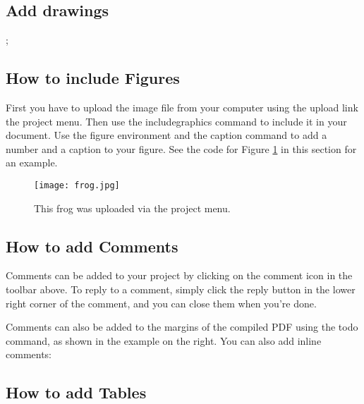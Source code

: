 \documentclass[a4paper,12pt]{article}
\begin{document}
\subsection{Add drawings}

;

\subsection{How to include Figures}

First you have to upload the image file from your computer using the upload link the project menu. Then use the includegraphics command to include it in your document. Use the figure environment and the caption command to add a number and a caption to your figure. See the code for Figure \ref{fig:frog} in this section for an example.

\begin{figure}
\centering
\texttt{[image: frog.jpg]}
\caption{\label{fig:frog}This frog was uploaded via the project menu.}
\end{figure}

\subsection{How to add Comments}

Comments  can be added to your project by clicking on the comment icon in the toolbar above. %
%
%
To reply to a comment, simply click the reply button in the lower right corner of the comment, and you can close them when you're done.

Comments can also be added to the margins of the compiled PDF using the todo command, as shown in the example on the right. You can also add inline comments:


\subsection{How to add Tables}
\end{document}
